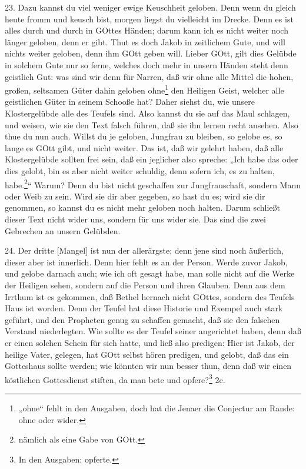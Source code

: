 23. Dazu kannst du viel weniger ewige Keuschheit geloben. Denn wenn du gleich heute fromm und keusch bist, morgen liegst du vielleicht im Drecke. Denn es ist alles durch und durch in GOttes Händen; darum kann ich es nicht weiter noch länger geloben, denn er gibt. Thut es doch Jakob in zeitlichem Gute, und will nichts weiter geloben, denn ihm GOtt geben will. Lieber GOtt, gilt dies Gelübde in solchem Gute nur so ferne, welches doch mehr in unsern Händen steht denn geistlich Gut: was sind wir denn für Narren, daß wir ohne alle Mittel die hohen, großen, seltsamen Güter dahin geloben ohne\footnote{„ohne“ fehlt in den Ausgaben, doch hat die Jenaer die Conjectur am Rande: ohne oder wider.} den Heiligen Geist, welcher alle geistlichen Güter in seinem Schooße hat? Daher siehst du, wie unsere Klostergelübde alle des Teufels sind. Also kannst du sie auf das Maul schlagen, und weisen, wie sie den Text falsch führen, daß sie ihn lernen recht ansehen. Also thue du nun auch. Willst du je geloben, Jungfrau zu bleiben, so gelobe es, so lange es GOtt gibt, und nicht weiter. Das ist, daß wir gelehrt haben, daß alle Klostergelübde sollten frei sein, daß ein jeglicher also spreche: „Ich habe das oder dies gelobt, bin es aber nicht weiter schuldig, denn sofern ich, es zu halten, habe.\footnote{nämlich als eine Gabe von GOtt.}“ Warum? Denn du bist nicht geschaffen zur Jungfrauschaft, sondern Mann oder Weib zu sein. Wird sie dir aber gegeben, so hast du es; wird sie dir genommen, so kannst du es nicht mehr geloben noch halten. Darum schließt dieser Text nicht wider uns, sondern für uns wider sie. Das sind die zwei Gebrechen an unsern Gelübden.

24. Der dritte [Mangel] ist nun der allerärgste; denn jene sind noch äußerlich, dieser aber ist innerlich. Denn hier fehlt es an der Person. Werde zuvor Jakob, und gelobe darnach auch; wie ich oft gesagt habe, man solle nicht auf die Werke der Heiligen sehen, sondern auf die Person und ihren Glauben. Denn aus dem Irrthum ist es gekommen, daß Bethel hernach nicht GOttes, sondern des Teufels Haus ist worden. Denn der Teufel hat diese Historie und Exempel auch stark geführt, und den Propheten genug zu schaffen gemacht, daß sie den falschen Verstand niederlegten. Wie sollte es
der Teufel seiner angerichtet haben, denn daß er einen solchen Schein für sich hatte, und ließ also predigen: Hier ist Jakob, der heilige Vater, gelegen, hat GOtt selbst hören predigen, und gelobt, daß das ein Gotteshaus sollte werden; wie könnten wir nun besser thun, denn daß wir einen köstlichen Gottesdienst stiften, da man bete und opfere?\footnote{In den Ausgaben: opferte.} 2c.

